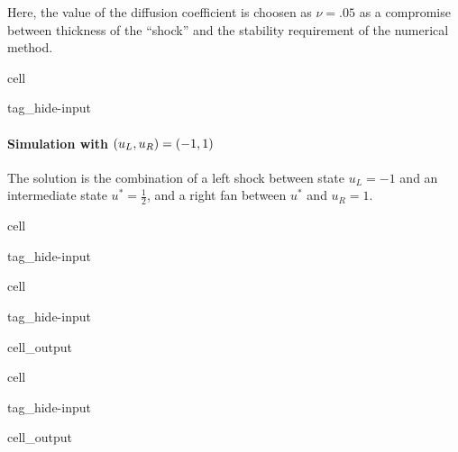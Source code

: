 \documentclass[letterpaper,10pt,english]{jupyterBook}
\begin{document}
\sphinxAtStartPar
Here, the value of the diffusion coefficient is choosen as \(\nu = .05\) as a compromise between thickness of the “shock” and the stability requirement of the numerical method.

\begin{sphinxuseclass}{cell}
\begin{sphinxuseclass}{tag_hide-input}
\end{sphinxuseclass}
\end{sphinxuseclass}

\paragraph{Simulation with \protect\((u_L, u_R) = (-1,1)\protect\)}
\label{\detokenize{ch/pde/hyperbolic-non-convex:simulation-with-u-l-u-r-1-1}}
\sphinxAtStartPar
The solution is the combination of a left shock between state \(u_L = -1\) and an intermediate state \(u^* = \frac{1}{2}\), and a right fan between \(u^*\) and \(u_R = 1\).

\begin{sphinxuseclass}{cell}
\begin{sphinxuseclass}{tag_hide-input}
\end{sphinxuseclass}
\end{sphinxuseclass}
\begin{sphinxuseclass}{cell}
\begin{sphinxuseclass}{tag_hide-input}\begin{sphinxVerbatimOutput}

\begin{sphinxuseclass}{cell_output}
\noindent{}

\end{sphinxuseclass}\end{sphinxVerbatimOutput}

\end{sphinxuseclass}
\end{sphinxuseclass}
\begin{sphinxuseclass}{cell}
\begin{sphinxuseclass}{tag_hide-input}\begin{sphinxVerbatimOutput}

\begin{sphinxuseclass}{cell_output}
\noindent{}

\end{sphinxuseclass}\end{sphinxVerbatimOutput}

\end{sphinxuseclass}
\end{sphinxuseclass}
\end{document}

